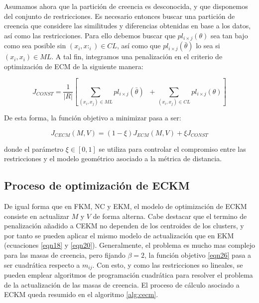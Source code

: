 Asumamos ahora que la partición de creencia es desconocida, y que disponemos del conjunto de restricciones. Es necesario entonces buscar una partición de creencia que considere las similitudes y diferencias obtenidas en base a los datos, así como las restricciones. Para ello debemos buscar que $pl_{i\times j} (\theta)$ sea tan bajo como sea posible sin $(x_i, x:_i) \in CL$, así como que $pl_{i\times j} (\bar{\theta})$ lo sea si $(x_i, x_i) \in ML$. A tal fin, integramos una penalización en el criterio de optimización de ECM de la siguiente manera:

\begin{equation}
J_{CONST} = \frac{1}{|R|} \left[\sum_{(x_i,x_j) \in ML} pl_{i\times j} (\bar{\theta})\;\; + \sum_{(x_i,x_j) \in CL} pl_{i\times j} (\theta)\right]
\label{eqn25}
\end{equation}

De esta forma, la función objetivo a minimizar pasa a ser:

\begin{equation}
J_{CECM}(M,V) = (1- \xi)J_{ECM}(M,V) + \xi J_{CONST}
\label{eqn26}
\end{equation}

donde el parámetro $\xi \in [0,1]$ se utiliza para controlar el compromiso entre las restricciones y el modelo geométrico asociado a la métrica de distancia.

\subsection{Proceso de optimización de ECKM}

De igual forma que en FKM, NC y EKM, el modelo de optimización de ECKM consiste en actualizar $M$ y $V$ de forma alterna. Cabe destacar que el termino de penalización añadido a CEKM no dependen de los centroides de los clusters, y por tanto se pueden aplicar el mismo modelo de actualización que en EKM (ecuaciones \ref{eqn18} y \ref{eqn20}). Generalmente, el problema es mucho mas complejo para las masas de creencia, pero fijando $\beta = 2$, la función objetivo \ref{eqn26} pasa a ser cuadrática respecto a $m_{ij}$. Con esto, y como las restricciones so lineales, se pueden emplear algoritmos de programación cuadrática para resolver el problema de la actualización de las masas de creencia. El proceso de cálculo asociado a ECKM queda resumido en el algoritmo \ref{alg:cecm}. 


